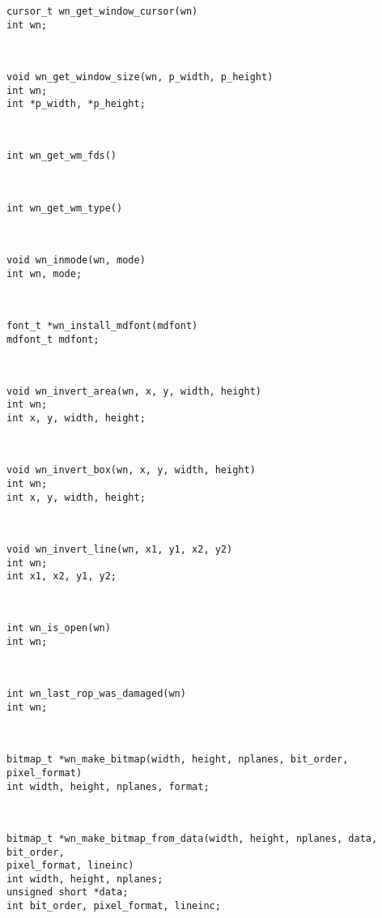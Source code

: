 \parbox[t]{5in}{\tt cursor\_t wn\_get\_window\_cursor(wn)\\int wn;}\> \pageref{wn_get_window_cursor}\\[0.1in]
\parbox[t]{5in}{\tt void wn\_get\_window\_size(wn, p\_width, p\_height)\\int wn;\\int *p\_width, *p\_height;}\> \pageref{wn_get_window_size}\\[0.1in]
\parbox[t]{5in}{\tt int wn\_get\_wm\_fds()}\> \pageref{wn_get_wm_fds}\\[0.1in]
\parbox[t]{5in}{\tt int wn\_get\_wm\_type()}\> \pageref{wn_get_wm_type}\\[0.1in]
\parbox[t]{5in}{\tt void wn\_inmode(wn, mode)\\int wn, mode;}\> \pageref{wn_inmode}\\[0.1in]
\parbox[t]{5in}{\tt font\_t *wn\_install\_mdfont(mdfont)\\mdfont\_t mdfont;}\> \pageref{wn_install_mdfont}\\[0.1in]
\parbox[t]{5in}{\tt void wn\_invert\_area(wn, x, y, width, height)\\int wn;\\int x, y, width, height;}\> \pageref{wn_invert_area}\\[0.1in]
\parbox[t]{5in}{\tt void wn\_invert\_box(wn, x, y, width, height)\\int wn;\\int x, y, width, height;}\> \pageref{wn_invert_box}\\[0.1in]
\parbox[t]{5in}{\tt void wn\_invert\_line(wn, x1, y1, x2, y2)\\int wn;\\int x1, x2, y1, y2;}\> \pageref{wn_invert_line}\\[0.1in]
\parbox[t]{5in}{\tt int wn\_is\_open(wn)\\int wn;}\> \pageref{wn_is_open}\\[0.1in]
\parbox[t]{5in}{\tt int wn\_last\_rop\_was\_damaged(wn)\\int wn;}\> \pageref{wn_last_rop_was_damaged}\\[0.1in]
\parbox[t]{5in}{\tt bitmap\_t *wn\_make\_bitmap(width, height, nplanes, bit\_order, pixel\_format)\\int width, height, nplanes, format;}\> \pageref{wn_make_bitmap}\\[0.1in]
\parbox[t]{5in}{\tt bitmap\_t *wn\_make\_bitmap\_from\_data(width, height, nplanes, data, bit\_order,\\                                                 pixel\_format, lineinc)\\int width, height, nplanes;\\unsigned short *data;\\int bit\_order, pixel\_format, lineinc;}\> \pageref{wn_make_bitmap_from_data}\\[0.1in]
